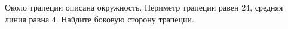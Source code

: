 \begin{ex}
	\begin{condition}
		Около трапеции описана окружность. Периметр трапеции равен \( 24 \), средняя линия равна \( 4 \). Найдите боковую сторону трапеции.
	\end{condition}
\end{ex}